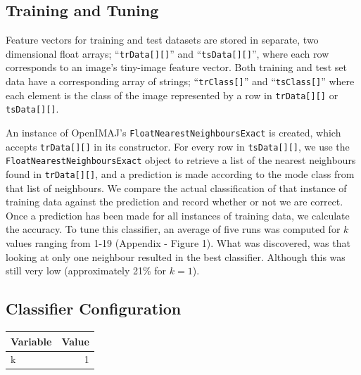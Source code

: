 \documentclass[a4paper]{article}
\begin{document}
\subsection{Training and Tuning}

Feature vectors for training and test datasets are stored in separate, two dimensional float arrays; ``\texttt{trData[][]}'' and ``\texttt{tsData[][]}'', where each row corresponds to an image’s tiny-image feature vector. Both training and test set data have a corresponding array of strings; ``\texttt{trClass[]}'' and ``\texttt{tsClass[]}'' where each element is the class of the image represented by a row in \texttt{trData[][]} or \texttt{tsData[][]}.

An instance of OpenIMAJ’s \texttt{FloatNearestNeighboursExact} is created, which accepts \texttt{trData[][]} in its constructor. For every row in \texttt{tsData[][]}, we use the \texttt{FloatNearestNeighboursExact} object to retrieve a list of the nearest neighbours found in \texttt{trData[][]}, and a prediction is made according to the mode class from that list of neighbours. We compare the actual classification of that instance of training data against the prediction and record whether or not we are correct. Once a prediction has been made for all instances of training data, we calculate the accuracy. To tune this classifier, an average of five runs was computed for $k$ values ranging from 1-19 (Appendix - Figure 1). What was discovered, was that looking at only one neighbour resulted in the best classifier. Although this was still very low (approximately 21\% for $k=1$).

\subsection{Classifier Configuration}

\begin{center}
    \def\arraystretch{1.5}%
    \begin{tabular}{ | l | r |}
    \hline
    \textbf{Variable} & \textbf{Value} \\ \hline
    k & 1 \\ \hline
    \end{tabular}
\end{center}
\bigskip

\end{document}
